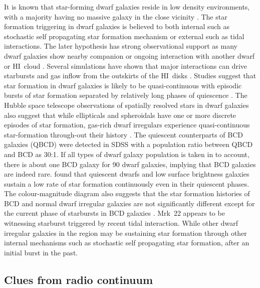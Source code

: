 \documentclass[useAMS,usenatbib]{mn2e}
\def\HI{H{\small{I}}~}
\begin{document}
It is known that star-forming dwarf galaxies reside in low density environments, with a majority having no massive galaxy in the close vicinity \citep{2011ApJ...743....8W}. The star formation triggering in dwarf galaxies is believed to both internal such as stochastic self propagating star formation mechanism \citep{1980ApJ...242..517G} or external such as tidal interactions. The later hypothesis has strong observational support as many dwarf galaxies show nearby companion or ongoing interaction with another dwarf or \HI cloud \citep{2001A&A...371..806N,2001A&A...374..800O,2001ApSSS.277..445P,2008MNRAS.388L..10B,
2008MNRAS.391..881E,2010MNRAS.403..295E,2016MNRAS.462...92J}. Several simulations have shown that major interactions can drive starbursts and gas inflow from the outskirts of the \HI disks \citep[e.g.,][]{2010ApJ...710L.156R}. Studies suggest that star formation in dwarf galaxies is likely to be quasi-continuous with episodic bursts of star formation separated by relatively long phases of quiescence \citep[e.g.,][]{1991ApJ...370...25T,1995A&A...303...41K,1999A&A...349..765M,2000ApJ...539..641T,2001AJ....121.2003V}. The Hubble space telescope observations of spatially resolved stars in dwarf galaxies also suggest that while ellipticals and spheroidals have one or more discrete episodes of star formation, gas-rich dwarf irregulars experience quasi-continuous star-formation through-out their history \citep{2003dhst.symp..128T}. The quiescent counterparts of BCD galaxies (QBCD) were detected in SDSS \citep{2008ApJ...685..194S} with a population ratio between QBCD and BCD as 30:1. If all types of dwarf galaxy population is taken in to account, there is about one BCD galaxy for 90 dwarf galaxies, implying that BCD galaxies are indeed rare. \citet{1998astro.ph..5042L} found that quiescent dwarfs and low surface brightness galaxies sustain a low rate of star formation continuously even in their quiescent phases. The colour-magnitude diagram also suggests that the star formation histories of BCD and normal dwarf irregular galaxies are not significantly different except for the current phase of starbursts in BCD galaxies \citep{2010AdAst2010E...3C}. Mrk~22 appears to be witnessing starburst triggered by recent tidal interaction. While other dwarf irregular galaxies in the region may be sustaining star formation through other internal mechanisms such as stochastic self propagating star formation, after an initial burst in the past.  

\subsection{Clues from radio continuum}
\end{document}
